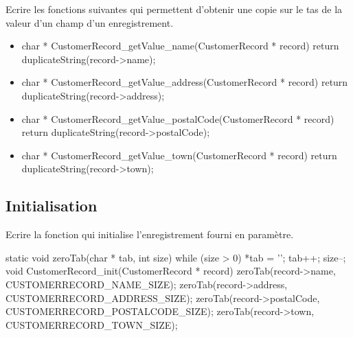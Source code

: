 Ecrire les fonctions suivantes qui permettent d'obtenir une copie sur le tas de la valeur d'un champ d'un enregistrement.
\begin{itemize}
\item {}
\begin{csourcecorrection}
char * CustomerRecord_getValue_name(CustomerRecord * record) {
    return duplicateString(record->name);
}
\end{csourcecorrection}
\item {}
\begin{csourcecorrection}
char * CustomerRecord_getValue_address(CustomerRecord * record) {
    return duplicateString(record->address);
}
\end{csourcecorrection}
\item {}
\begin{csourcecorrection}
char * CustomerRecord_getValue_postalCode(CustomerRecord * record) {
    return duplicateString(record->postalCode);
}
\end{csourcecorrection}
\item {}
\begin{csourcecorrection}
char * CustomerRecord_getValue_town(CustomerRecord * record) {
    return duplicateString(record->town);
}
\end{csourcecorrection}
\end{itemize}

\subsection{Initialisation}

Ecrire la fonction  qui initialise l'enregistrement fourni en paramètre.

\begin{csourcecorrection}
static void zeroTab(char * tab, int size) {
    while (size > 0) {
        *tab = '\0';
        tab++;
        size--;
    }
}
void CustomerRecord_init(CustomerRecord * record) {
    zeroTab(record->name, CUSTOMERRECORD_NAME_SIZE);
    zeroTab(record->address, CUSTOMERRECORD_ADDRESS_SIZE);
    zeroTab(record->postalCode, CUSTOMERRECORD_POSTALCODE_SIZE);
    zeroTab(record->town, CUSTOMERRECORD_TOWN_SIZE);
}
\end{csourcecorrection}

